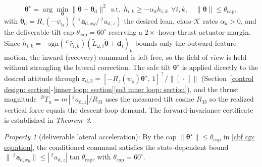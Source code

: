 \begin{equation} \label{cbf qp: equation}
    \boldsymbol{\theta}^\star=\arg\min_{\boldsymbol{\theta}}\|\boldsymbol{\theta}-\boldsymbol{\theta}_\text{d}\|^2\ \ \text{s.t.}\ \ \dot{h}_{i,k}\ge-\alpha_k h_{i,k}\ \ \forall i,k,\quad \|\boldsymbol{\theta}\|\le\theta_\text{cap},
\end{equation}
with $\boldsymbol{\theta}_\text{d}=R_z(-\psi_\text{b})(\,^\mathcal{I}\boldsymbol{a}_{\text{d},xy}/\,^\mathcal{I}a_{\text{d},z})$ the desired lean, class-$\mathcal{K}$ rates $\alpha_k>0$, and the deliverable-tilt cap $\theta_\text{cap}=60^\circ$ reserving a $2\times$-hover-thrust actuator margin. Since $\dot{h}_{i,k}=-\mathrm{sgn}(\,^\mathcal{C}\hat{r}_{i,k})(\tilde{L}_{\omega,i}\dot{\boldsymbol{\theta}}+\boldsymbol{d}_i)_k$ bounds only the outward feature motion, the inward (recovery) command is left free, so the field of view is held without strangling the lateral correction. The safe tilt $\boldsymbol{\theta}^\star$ is applied directly to the desired attitude through $\boldsymbol{r}_{\text{d},3}=[-R_z(\psi_\text{b})\boldsymbol{\theta}^\star,\,1]^\top/\|[\,\cdot\,]\|$ (Section~\ref{control design: section}-\ref{inner loop: section}\ref{so3 inner loop: section}), and the thrust magnitude $\,^\mathcal{B}T_u=m\,|\,^\mathcal{I}a_{\text{d},z}|/R_{33}$ uses the measured tilt cosine $R_{33}$ so the realized vertical force equals the descent-loop demand. The forward-invariance certificate is established in \textit{Theorem~3}.

\textit{Property 1} (deliverable lateral acceleration): By the cap $\|\boldsymbol{\theta}^\star\|\le\theta_\text{cap}$ in \eqref{cbf qp: equation}, the conditioned command satisfies the state-dependent bound $\|\,^\mathcal{I}\boldsymbol{a}_{\text{d},xy}\|\le|\,^\mathcal{I}a_{\text{d},z}|\tan\theta_\text{cap}$, with $\theta_\text{cap}=60^\circ$.


